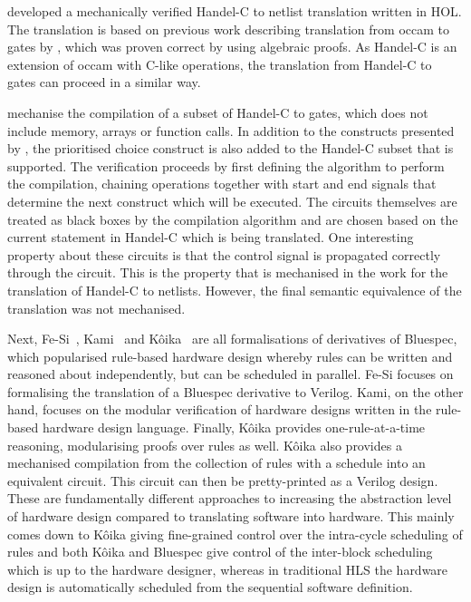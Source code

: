 \textcite{perna12_mechan_wire_wise_verif_handel_c_synth} developed a
mechanically verified Handel-C to netlist translation written in HOL.  The
translation is based on previous work describing translation from occam to gates
by \textcite{page91_compil_occam}, which was proven correct by
\textcite{jifeng93_towar} using algebraic proofs.  As Handel-C is an extension
of occam with C-like operations, the translation from Handel-C to gates can
proceed in a similar way.

\citeauthor{perna12_mechan_wire_wise_verif_handel_c_synth} mechanise the
compilation of a subset of Handel-C to gates, which does not include memory,
arrays or function calls.  In addition to the constructs presented by
\citeauthor{page91_compil_occam}, the prioritised choice construct is also added
to the Handel-C subset that is supported.  The verification proceeds by first
defining the algorithm to perform the compilation, chaining operations together
with start and end signals that determine the next construct which will be
executed.  The circuits themselves are treated as black boxes by the compilation
algorithm and are chosen based on the current statement in Handel-C which is
being translated.  One interesting property about these circuits is that the
control signal is propagated correctly through the circuit.  This is the property that
is mechanised in the work for the translation of Handel-C to netlists.  However,
the final semantic equivalence of the translation was not mechanised.

Next, Fe-Si~\cite{braibant13_formal_verif_hardw_synth}, Kami~\cite{choi17_kami}
and Kôika~\cite[]{bourgeat20_essen_blues} are all formalisations of derivatives
of Bluespec, which popularised rule-based hardware design whereby rules can be
written and reasoned about independently, but can be scheduled in parallel.
Fe-Si focuses on formalising the translation of a Bluespec derivative to
Verilog.  Kami, on the other hand, focuses on the modular verification of
hardware designs written in the rule-based hardware design language.  Finally,
Kôika provides one-rule-at-a-time reasoning, modularising proofs over rules as
well.  Kôika also provides a mechanised compilation from the collection of rules
with a schedule into an equivalent circuit.  This circuit can then be
pretty-printed as a Verilog design.  These are fundamentally different
approaches to increasing the abstraction level of hardware design compared to
translating software into hardware.  This mainly comes down to Kôika giving
fine-grained control over the intra-cycle scheduling of rules and both Kôika and
Bluespec give control of the inter-block scheduling which is up to the hardware
designer, whereas in traditional \gls{HLS} the hardware design is automatically
scheduled from the sequential software definition.

